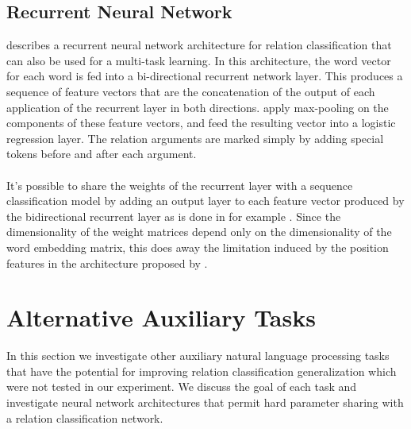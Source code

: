 \subsection{Recurrent Neural Network}
\citet{zhang2015} describes a recurrent neural network architecture for relation classification that can also be used for a multi-task learning. In this architecture, the word vector for each word is fed into a bi-directional recurrent network layer. This produces a sequence of feature vectors that are the concatenation of the output of each application of the recurrent layer in both directions. \citet{zhang2015} apply max-pooling on the components of these feature vectors, and feed the resulting vector into a logistic regression layer. The relation arguments are marked simply by adding special tokens before and after each argument.
\\\\
It's possible to share the weights of the recurrent layer with a sequence classification model by adding an output layer to each feature vector produced by the bidirectional recurrent layer as is done in for example \citet{bingel2017}. Since the dimensionality of the weight matrices depend only on the dimensionality of the word embedding matrix, this does away the limitation induced by the position features in the architecture proposed by \citet{nguyen2015}.

\section{Alternative Auxiliary Tasks}
In this section we investigate other auxiliary natural language processing tasks that have the potential for improving relation classification generalization which were not tested in our experiment. We discuss the goal of each task and investigate neural network architectures that permit hard parameter sharing with a relation classification network.

